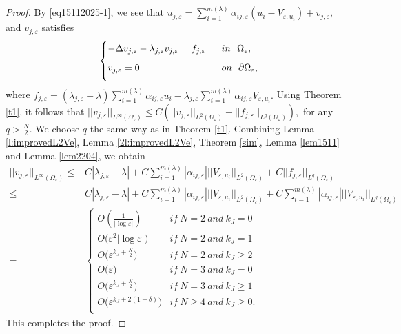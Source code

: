 \documentclass[11pt,reqno]{article}
\numberwithin{equation}{section}
\newcommand\e\varepsilon
\newcommand\la\lambda
\renewcommand\O\Omega
\begin{document}
\begin{proof}
    By \eqref{eq15112025-1}, we see that 
    $
    u_{j,\e}=\sum_{i=1}^{m(\lambda)}\alpha_{ij,\e}(u_i-V_{\e,u_i})+v_{j,\e},
    $
    and $v_{j,\e}$ satisfies
    \begin{equation}
    \begin{cases}
       \displaystyle -\Delta v_{j,\e}-\lambda_{j,\e}v_{j,\e}=f_{j,\e}\ \ &in \ \ \O_\e,\vspace{2mm}\\
       \displaystyle v_{j,\e}=0\ \ &on \ \ \partial\O_\e,\vspace{2mm}
    \end{cases}
\end{equation}
where $f_{j,\e}=(\lambda_{j,\e}-\lambda)\sum_{i=1}^{m(\la)}\alpha_{ij,\e}  u_i-\lambda_{j,\e}\sum_{i=1}^{m(\la)}\alpha_{ij,\e}  V_{\e,u_i} .$
Using Theorem \ref{t1}, it follows that 
$
||v_{j,\e}||_{L^\infty(\O_\e)}\leq C(||v_{j,\e}||_{L^2(\O_\e)}+||f_{j,\e}||_{L^q(\O_\e)}),
$
for any $q>\frac{N}{2}$. We choose $q$  the same way as in Theorem \ref{t1}. Combining Lemma \ref{l:improvedL2Ve}, Lemma \ref{2l:improvedL2Ve}, Theorem \ref{sim},  Lemma \ref{lem1511} and Lemma \ref{lem2204}, we obtain
\begin{align*}
   ||v_{j,\e}||_{L^\infty(\O_\e)}\leq &C|\lambda_{j,\e}-\lambda|+C\sum_{i=1}^{m(\la)}|\alpha_{ij,\e}|  ||V_{\e,u_i}||_{L^2(\O_\e)}+C||f_{j,\e}||_{L^q(\O_\e)} \\
   \leq &C|\lambda_{j,\e}-\lambda|+C\sum_{i=1}^{m(\la)}|\alpha_{ij,\e}|  ||V_{\e,u_i}||_{L^2(\O_\e)}+C\sum_{i=1}^{m(\la)}|\alpha_{ij,\e}|  ||V_{\e,u_i}||_{L^q(\O_\e)} \\
   =& 
   \begin{cases}
                O\left(\frac{1}{|\log\e|}\right)\quad& if  \ N=2  \ and\ k_J=0\\
                O\big(\e^2|\log\e|\big) & if  \ N=2  \ and\ k_J=1\\
                O\big(\e^{k_J+\frac{N}{2}}\big) & if  \ N=2  \ and\ k_J\ge 2\\
                O\big(\e\big) & if  \ N=3  \ and\ k_J=0\\
                O\big(\e^{k_J+\frac{N}{2}}\big) & if  \ N=3  \ and\ k_J\ge 1\\
                 O\big(\e^{k_J+ 2(1-\delta)}\big) & if  \ N\ge 4  \ and\ k_J\ge 0.\\
			\end{cases}
\end{align*}
This completes the proof.
\end{proof}
\end{document}

